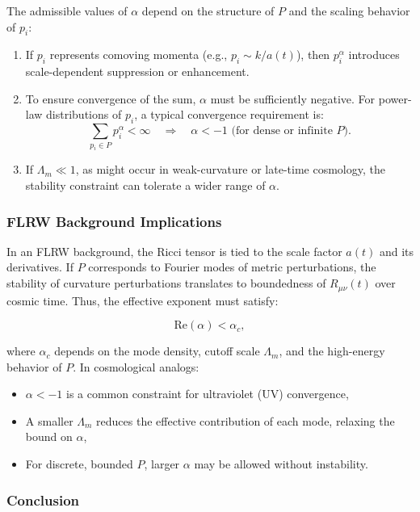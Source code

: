 \documentclass[12pt]{article}
\theoremstyle{plain}
\begin{document}
The admissible values of $\alpha$ depend on the structure of $P$ and the scaling behavior of $p_i$:
\begin{enumerate}
    \item If $p_i$ represents comoving momenta (e.g., $p_i \sim k/a(t)$), then $p_i^\alpha$ introduces scale-dependent suppression or enhancement.
    \item To ensure convergence of the sum, $\alpha$ must be sufficiently negative. For power-law distributions of $p_i$, a typical convergence requirement is:
    \[
    \sum_{p_i \in P} p_i^\alpha < \infty \quad \Rightarrow \quad \alpha < -1 \text{ (for dense or infinite $P$)}.
    \]
    \item If $\Lambda_m \ll 1$, as might occur in weak-curvature or late-time cosmology, the stability constraint can tolerate a wider range of $\alpha$.
\end{enumerate}

\subsubsection*{FLRW Background Implications}

In an FLRW background, the Ricci tensor is tied to the scale factor $a(t)$ and its derivatives. If $P$ corresponds to Fourier modes of metric perturbations, the stability of curvature perturbations translates to boundedness of $R_{\mu\nu}(t)$ over cosmic time. Thus, the effective exponent must satisfy:

\begin{equation}
\text{Re}(\alpha) < \alpha_c,
\end{equation}

where $\alpha_c$ depends on the mode density, cutoff scale $\Lambda_m$, and the high-energy behavior of $P$. In cosmological analogs:
\begin{itemize}
    \item $\alpha < -1$ is a common constraint for ultraviolet (UV) convergence,
    \item A smaller $\Lambda_m$ reduces the effective contribution of each mode, relaxing the bound on $\alpha$,
    \item For discrete, bounded $P$, larger $\alpha$ may be allowed without instability.
\end{itemize}

\subsubsection*{Conclusion}
\end{document}
